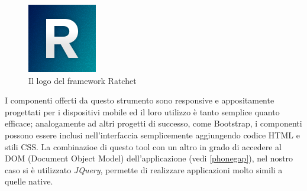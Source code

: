 \begin{figure}[H]
	\centering
	\includegraphics[scale=0.8]{Implementazione/ratchet_logo.png}
	\caption{Il logo del framework Ratchet}
	\label{fig:logo_ratchet}
\end{figure}

I componenti offerti da questo strumento sono responsive e appositamente progettati per i dispositivi mobile ed il loro utilizzo è tanto semplice quanto efficace; analogamente ad altri progetti di successo, come Bootstrap, i componenti possono essere inclusi nell'interfaccia semplicemente aggiungendo codice HTML e stili CSS. La combinazioe di questo tool con un altro in grado di accedere al DOM (Document Object Model) dell'applicazione (vedi \ref{phonegap}), nel nostro caso si è utilizzato\textit{ JQuery}, permette di realizzare applicazioni molto simili a quelle native.\\
